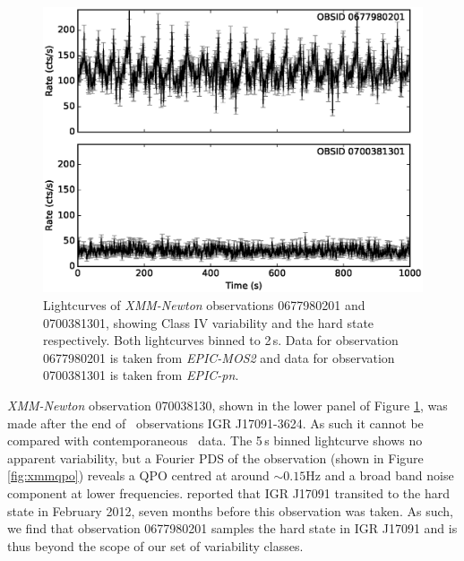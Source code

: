 \begin{figure}
    \includegraphics[width=0.8\columnwidth, trim = 0.6cm 0 3.9cm 0]{images/xmmlc.eps}
    \captionsetup{singlelinecheck=off}
    \caption{Lightcurves of \textit{XMM-Newton} observations 0677980201 and 0700381301, showing Class IV variability and the hard state respectively.  Both lightcurves binned to 2\,s.  Data for observation 0677980201 is taken from \textit{EPIC-MOS2} and data for observation 0700381301 is taken from \textit{EPIC-pn}.}
   \label{fig:XMM}
\end{figure}

\par \textit{XMM-Newton} observation 070038130, shown in the lower panel of Figure \ref{fig:XMM}, was made after the end of \rxte\ observations IGR J17091-3624.  As such it cannot be compared with contemporaneous \rxte\ data.  The 5\,s binned lightcurve shows no apparent variability, but a Fourier PDS of the observation (shown in Figure \ref{fig:xmmqpo}) reveals a QPO centred at around $\sim0.15$Hz and a broad band noise component at lower frequencies.  \citet{Drave_Return} reported that IGR J17091 transited to the hard state in February 2012, seven months before this observation was taken.  As such, we find that observation 0677980201 samples the hard state in IGR J17091 and is thus beyond the scope of our set of variability classes.

